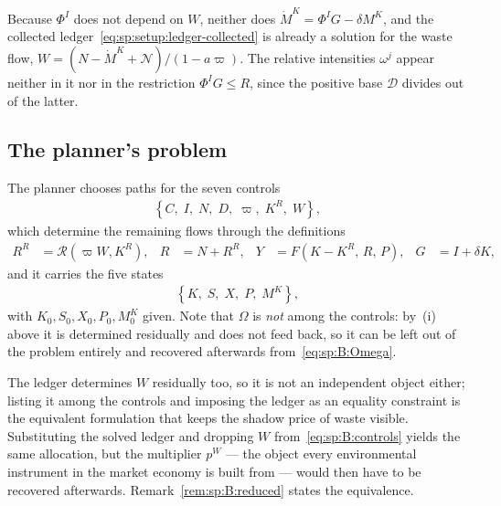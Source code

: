  Because $\Phi^I$ does not depend on $W$, neither does
$\dot M^K=\Phi^IG-\delta M^K$, and the collected ledger~\eqref{eq:sp:setup:ledger-collected} is already
a solution for the waste flow, $W=\left(N-\dot M^K+\mathcal N\right)/\left(1-a\varpi\right)$. The
relative intensities $\omega^j$ appear neither in it nor in the restriction $\Phi^IG\le R$, since the
positive base $\mathcal D$ divides out of the latter.


\subsection{The planner's problem}\label{sec:sp:B:problem}

 The planner chooses paths for the seven controls
\begin{align}
\left\{C,\;I,\;N,\;D,\;\varpi,\;K^R,\;W\right\},
\label{eq:sp:B:controls}
\end{align}
which determine the remaining flows through the definitions
\begin{align}
R^R &= \mathcal R\left(\varpi W,K^R\right),
&
R &= N+R^R,
&
Y &= F\left(K-K^R,\,R,\,P\right),
&
G &= I+\delta K,
\label{eq:sp:B:definitions}
\end{align}
and it carries the five states
\begin{align}
\left\{K,\;S,\;X,\;P,\;M^K\right\},
\label{eq:sp:B:states}
\end{align}
with $K_0,S_0,X_0,P_0,M^K_0$ given. Note that $\Omega$ is \emph{not} among the controls: by~(i) above
it is determined residually and does not feed back, so it can be left out of the problem entirely and
recovered afterwards from~\eqref{eq:sp:B:Omega}.

 The ledger determines $W$ residually too, so it is not an
independent object either; listing it among the controls and imposing the ledger as an equality
constraint is the equivalent formulation that keeps the shadow price of waste visible. Substituting the
solved ledger and dropping $W$ from~\eqref{eq:sp:B:controls} yields the same allocation, but the
multiplier $p^W$ --- the object every environmental instrument in the market economy is built from ---
would then have to be recovered afterwards. Remark~\ref{rem:sp:B:reduced} states the equivalence.

